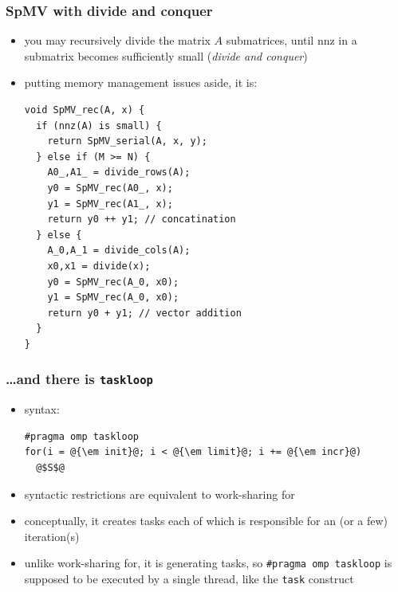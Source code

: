 \documentclass[12pt,dvipdfmx]{beamer}
\begin{document}
\begin{frame}[fragile]
  \frametitle{SpMV with divide and conquer}
  \begin{itemize}
  \item 
    you may recursively divide the matrix $A$ submatrices, until
    nnz in a submatrix becomes sufficiently small ({\it divide and conquer})
  \item putting memory management issues aside, it is:
\begin{lstlisting}
void SpMV_rec(A, x) {
  if (nnz(A) is small) {
    return SpMV_serial(A, x, y);
  } else if (M >= N) {
    A0_,A1_ = divide_rows(A);
    y0 = SpMV_rec(A0_, x); 
    y1 = SpMV_rec(A1_, x); 
    return y0 ++ y1; // concatination
  } else {
    A_0,A_1 = divide_cols(A);
    x0,x1 = divide(x);
    y0 = SpMV_rec(A_0, x0); 
    y1 = SpMV_rec(A_0, x0); 
    return y0 + y1; // vector addition
  }
}
\end{lstlisting}
\end{itemize}
\end{frame}

\begin{frame}[fragile]
\frametitle{\ldots and there is {\tt taskloop}}

\begin{itemize}
\item syntax:
\begin{lstlisting}
#pragma omp taskloop
for(i = @{\em init}@; i < @{\em limit}@; i += @{\em incr}@) 
  @$S$@
\end{lstlisting}
\item syntactic restrictions are equivalent to work-sharing for
\item conceptually, it creates tasks each of which is
  responsible for an (or a few) iteration(s)
\item unlike work-sharing for, it is generating tasks, so
  {\tt \#pragma omp taskloop} is supposed to be executed by a single thread,
  like the {\tt task} construct
\end{itemize}
\end{frame}

\end{document}
